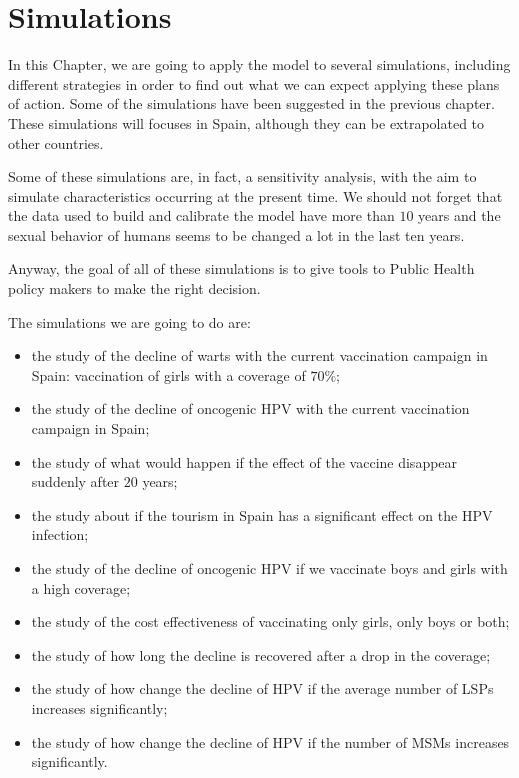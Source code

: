 \chapter{Simulations}\label{HPVSpain}
In this Chapter, we are going to apply the model to several simulations, including different strategies in order to find out what we can expect applying these plans of action. Some of the simulations have been suggested in the previous chapter. These simulations will focuses in Spain, although they can be extrapolated to other countries. 

Some of these simulations are, in fact, a sensitivity analysis, with the aim to simulate characteristics occurring at the present time. We should not forget that the data used to build and calibrate the model have more than $10$ years and the sexual behavior of humans seems to be changed a lot in the last ten years.

Anyway, the goal of all of these simulations is to give tools to Public Health policy makers to make the right decision.
 
The simulations we are going to do are:

\begin{itemize}
\item the study of the decline of warts with the current vaccination campaign in Spain: vaccination of girls with a coverage of $70\%$;
\item the study of the decline of oncogenic HPV with the current vaccination campaign in Spain;
\item the study of what would happen if the effect of the vaccine disappear suddenly after $20$ years;
\item the study about if the tourism in Spain has a significant effect on the HPV infection;
\item the study of the decline of oncogenic HPV if we vaccinate boys and girls with a high coverage;
\item the study of the cost effectiveness of vaccinating only girls, only boys or both;
\item the study of how long the decline is recovered after a drop in the coverage;
\item the study of how change the decline of HPV if the average number of LSPs increases significantly;
\item the study of how change the decline of HPV if the number of MSMs increases significantly.
\end{itemize}

